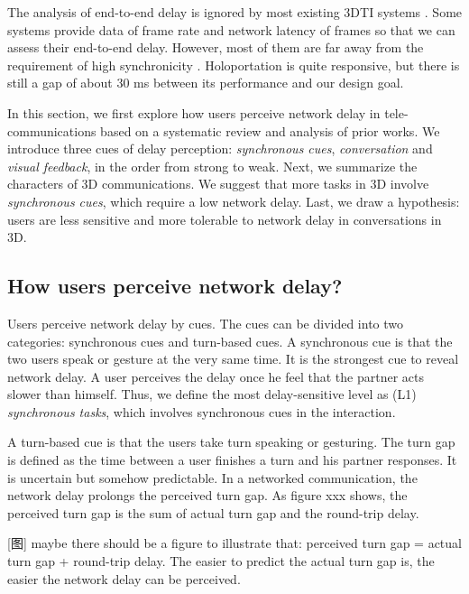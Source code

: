 The analysis of end-to-end delay is ignored by most existing 3DTI systems \cite{maimone2011encumbrance, kurillo2008immersive, petit2010multicamera, pejsa2016room2room}. Some systems provide data of frame rate and network latency of frames so that we can assess their end-to-end delay. However, most of them are far away from the requirement of high synchronicity \cite{gross2003blue, beck2013immersive, gibbs1999teleport}. Holoportation \cite{orts2016holoportation} is quite responsive, but there is still a gap of about 30 ms between its performance and our design goal.



In this section, we first explore how users perceive network delay in tele-communications based on a systematic review and analysis of prior works. We introduce three cues of delay perception: \emph{synchronous cues}, \emph{conversation} and \emph{visual feedback}, in the order from strong to weak. Next, we summarize the characters of 3D communications. We suggest that more tasks in 3D involve \emph{synchronous cues}, which require a low network delay. Last, we draw a hypothesis: users are less sensitive and more tolerable to network delay in conversations in 3D.


\subsection{How users perceive network delay?}

Users perceive network delay by cues. The cues can be divided into two categories: synchronous cues and turn-based cues. A synchronous cue is that the two users speak or gesture at the very same time. It is the strongest cue to reveal network delay. A user perceives the delay once he feel that the partner acts slower than himself. Thus, we define the most delay-sensitive level as (L1) \emph{synchronous tasks}, which involves synchronous cues in the interaction.

A turn-based cue is that the users take turn speaking or gesturing. The turn gap is defined as the time between a user finishes a turn and his partner responses. It is uncertain but somehow predictable. In a networked communication, the network delay prolongs the perceived turn gap. As figure xxx shows, the perceived turn gap is the sum of actual turn gap and the round-trip delay.

[图] maybe there should be a figure to illustrate that: perceived turn gap = actual turn gap + round-trip delay. The easier to predict the actual turn gap is, the easier the network delay can be perceived. 

